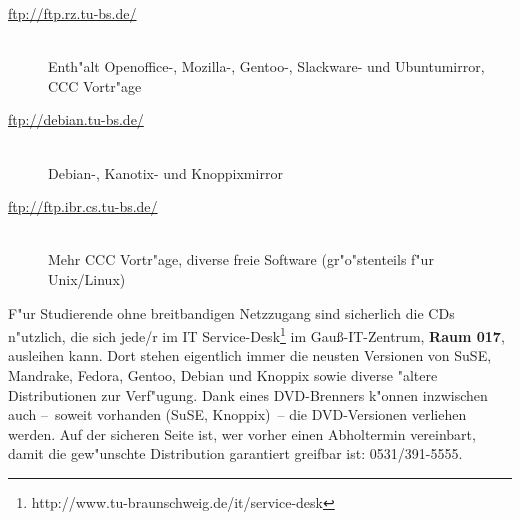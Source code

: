 \begin{description}
\item[\url{ftp://ftp.rz.tu-bs.de/}]~\\Enth"alt Openoffice-, Mozilla-,
Gentoo-, Slackware- und Ubuntumirror, CCC Vortr"age
\item[\url{ftp://debian.tu-bs.de/}]~\\Debian-, Kanotix- und Knoppixmirror
\item[\url{ftp://ftp.ibr.cs.tu-bs.de/}]~\\Mehr CCC Vortr"age, diverse freie
Software (gr"o"stenteils f"ur Unix/Linux)
\end{description}
F"ur Studierende ohne breitbandigen Netzzugang sind sicherlich die CDs 
n"utzlich, die sich jede/r im
IT Service-Desk\footnote{http://www.tu-braunschweig.de/it/service-desk}
im Gauß-IT-Zentrum, \textbf{Raum 017}, ausleihen kann. Dort stehen eigentlich
immer die neusten Versionen von SuSE, Mandrake, Fedora, Gentoo, Debian und Knoppix
sowie diverse "altere Distributionen zur Verf"ugung. Dank eines DVD-Brenners
k"onnen inzwischen auch --~soweit vorhanden (SuSE, Knoppix)~-- die
DVD-Versionen verliehen werden. Auf der sicheren Seite ist, wer vorher einen
Abholtermin vereinbart, damit die gew"unschte Distribution garantiert greifbar
ist: 0531/391-5555.
